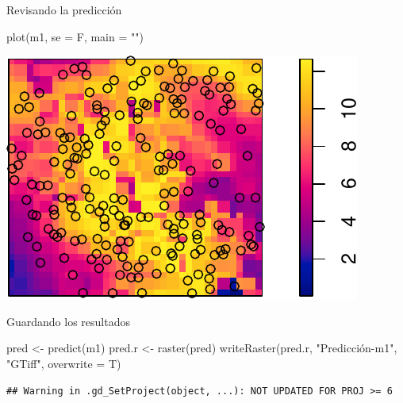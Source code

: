 \documentclass[
  11pt,
  ignorenonframetext,
]{beamer}
\newenvironment{Shaded}{}{}
\newcommand{\AttributeTok}[1]{\textcolor[rgb]{0.49,0.56,0.16}{#1}}
\newcommand{\FunctionTok}[1]{\textcolor[rgb]{0.02,0.16,0.49}{#1}}
\newcommand{\NormalTok}[1]{#1}
\newcommand{\OtherTok}[1]{\textcolor[rgb]{0.00,0.44,0.13}{#1}}
\newcommand{\StringTok}[1]{\textcolor[rgb]{0.25,0.44,0.63}{#1}}
\begin{document}
\begin{frame}[fragile]{Revisando la predicción}
\protect\hypertarget{revisando-la-predicciuxf3n}{}
\begin{Shaded}
\begin{Highlighting}[]
\FunctionTok{plot}\NormalTok{(m1, }\AttributeTok{se =}\NormalTok{ F, }\AttributeTok{main =} \StringTok{""}\NormalTok{)}
\end{Highlighting}
\end{Shaded}

\begin{center}\includegraphics{Tutorial-spatstat-2_files/figure-beamer/unnamed-chunk-22-1} \end{center}
\end{frame}

\begin{frame}[fragile]{Guardando los resultados}
\protect\hypertarget{guardando-los-resultados}{}
\begin{Shaded}
\begin{Highlighting}[]
\NormalTok{pred }\OtherTok{\textless{}{-}} \FunctionTok{predict}\NormalTok{(m1)}
\NormalTok{pred.r }\OtherTok{\textless{}{-}} \FunctionTok{raster}\NormalTok{(pred)}
\FunctionTok{writeRaster}\NormalTok{(pred.r, }\StringTok{"Predicción{-}m1"}\NormalTok{, }\StringTok{"GTiff"}\NormalTok{,}
            \AttributeTok{overwrite =}\NormalTok{ T)}
\end{Highlighting}
\end{Shaded}

\begin{verbatim}
## Warning in .gd_SetProject(object, ...): NOT UPDATED FOR PROJ >= 6
\end{verbatim}
\end{frame}
\end{document}
